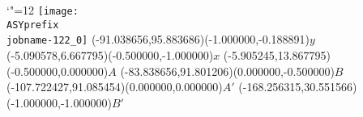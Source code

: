 \setlength{\unitlength}{1pt}%
\makeatletter%
\let\ASYencoding\f@encoding%
\let\ASYfamily\f@family%
\let\ASYseries\f@series%
\let\ASYshape\f@shape%
\makeatother%
{\catcode`"=12%
\texttt{[image: \\ASYprefix\\jobname-122\_0]}%
}%
\color{ASYcolor}%
\fontsize{12.000000}{14.400000}\selectfont%
\usefont{\ASYencoding}{\ASYfamily}{\ASYseries}{\ASYshape}%
\ASYalign(-91.038656,95.883686)(-1.000000,-0.188891){$y$}%
\color{ASYcolor}%
\fontsize{12.000000}{14.400000}\selectfont%
\ASYalign(-5.090578,6.667795)(-0.500000,-1.000000){$x$}%
\color{ASYcolor}%
\fontsize{12.000000}{14.400000}\selectfont%
\ASYalign(-5.905245,13.867795)(-0.500000,0.000000){$A$}%
\color{ASYcolor}%
\fontsize{12.000000}{14.400000}\selectfont%
\ASYalign(-83.838656,91.801206)(0.000000,-0.500000){$B$}%
\color{ASYcolor}%
\fontsize{12.000000}{14.400000}\selectfont%
\ASYalign(-107.722427,91.085454)(0.000000,0.000000){$A'$}%
\color{ASYcolor}%
\fontsize{12.000000}{14.400000}\selectfont%
\ASYalign(-168.256315,30.551566)(-1.000000,-1.000000){$B'$}%
